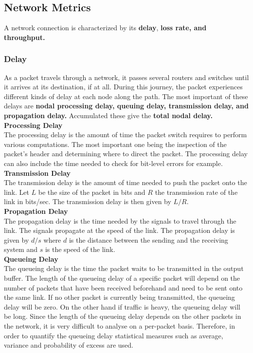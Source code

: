 \subsection{Network Metrics}
A network connection is characterized by its \textbf{delay}, \textbf{loss rate, and throughput.}

\subsubsection{Delay}
As a packet travels through a network, it passes several routers and switches until it arrives at its destination, if at all. During this journey, the packet experiences different kinds of delay at each node along the path. The most important of these delays are \textbf{nodal processing delay, queuing delay, transmission delay, and propagation delay.} Accumulated these give the \textbf{total nodal delay.} \vspace{.3cm}\\
\noindent \textbf{Processing Delay}\\
The processing delay is the amount of time the packet switch requires to perform various computations. The most important one being the inspection of the packet's header and determining where to direct the packet. The processing delay can also include the time needed to check for bit-level errors for example.\vspace{.3cm}\\
\noindent \textbf{Transmission Delay}\\
The transmission delay is the amount of time needed to push the packet onto the link. Let $L$ be the size of the packet in bits and $R$ the transmission rate of the link in bits/sec. The transmission delay is then given by $L/R$.
\vspace{.3cm}\\
\noindent \textbf{Propagation Delay}\\
The propagation delay is the time needed by the signals to travel through the link. The signals propagate at the speed of the link. The propagation delay is given by $d/s$ where $d$ is the distance between the sending and the receiving system and $s$ is the speed of the link.
\vspace{.3cm}\\
\noindent \textbf{Queueing Delay}\\
The queueing delay is the time the packet waits to be transmitted in the output buffer. The length of the queueing delay of a specific packet will depend on the number of packets that have been received beforehand and need to be sent onto the same link. If no other packet is currently being transmitted, the queueing delay will be zero. On the other hand if traffic is heavy, the queueing delay will be long. Since the length of the queueing delay depends on the other packets in the network, it is very difficult to analyse on a per-packet basis. Therefore, in order to quantify the queueing delay statistical measures such as average, variance and probability of excess are used.\vspace{.2cm}\\
